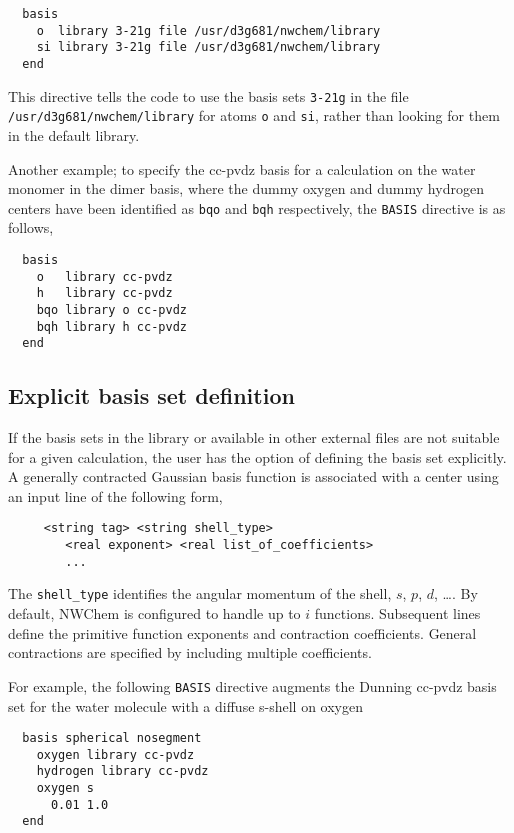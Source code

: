 \begin{verbatim}
  basis
    o  library 3-21g file /usr/d3g681/nwchem/library
    si library 3-21g file /usr/d3g681/nwchem/library
  end
\end{verbatim}

This directive tells the code to use the basis sets \verb+3-21g+ in
the file {\tt /usr/\-d3g681/\-nwchem/\-library} for atoms \verb+o+ and
\verb+si+, rather than looking for them in the default library.

Another example;  to specify the cc-pvdz basis for a calculation on
the water monomer in the dimer basis, where the dummy oxygen and dummy
hydrogen centers have been identified as \verb+bqo+ and \verb+bqh+
respectively, the \verb+BASIS+ directive is as follows,

\begin{verbatim}
  basis
    o   library cc-pvdz
    h   library cc-pvdz
    bqo library o cc-pvdz
    bqh library h cc-pvdz
  end
\end{verbatim}

\subsection{Explicit basis set definition}

If the basis sets in the library or available in other external files
are not suitable for a given calculation, the user has the option
of defining the basis set explicitly.
A generally contracted Gaussian basis function is associated with a
center using an input line of the following form,
\begin{verbatim}
     <string tag> <string shell_type>
        <real exponent> <real list_of_coefficients>
        ...
\end{verbatim}

The \verb+shell_type+ identifies the angular momentum of the shell,
$s$, $p$, $d$, \ldots.  By default, NWChem is configured to handle up
to $i$ functions.  Subsequent lines define the primitive function
exponents and contraction coefficients.  General contractions are
specified by including multiple coefficients.

For example, the following \verb+BASIS+ directive augments the Dunning
cc-pvdz basis set for the water molecule with a diffuse s-shell on
oxygen
\begin{verbatim}
  basis spherical nosegment
    oxygen library cc-pvdz
    hydrogen library cc-pvdz
    oxygen s
      0.01 1.0
  end
\end{verbatim}

